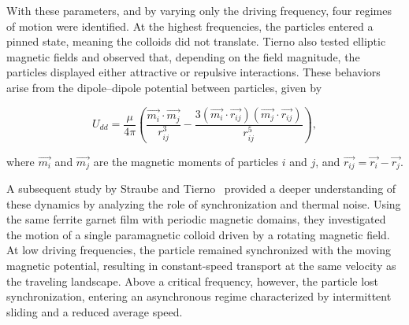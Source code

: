 With these parameters, and by varying only the driving frequency, four regimes of motion were identified. At the highest frequencies, the particles entered a pinned state, meaning the colloids did not translate. Tierno also tested elliptic magnetic fields and observed that, depending on the field magnitude, the particles displayed either attractive or repulsive interactions. These behaviors arise from the dipole–dipole potential between particles, given by

\begin{equation}
  U_{dd} = \frac{\mu}{4\pi} \left( \frac{\vec{m_i} \cdot \vec{m_j}}{r^3_{ij}} - \frac{3(\vec{m_i} \cdot \vec{r_{ij}})(\vec{m_j} \cdot \vec{r_{ij}})}{r^5_{ij}} \right),
\label{eq:dipolepairpotential}
\end{equation}

where $\vec{m_i}$ and $\vec{m_j}$ are the magnetic moments of particles $i$ and $j$, and $\vec{r_{ij}} = \vec{r_i} - \vec{r_j}$.

A subsequent study by Straube and Tierno~\cite{straube2013synchronous} provided a deeper understanding of these dynamics by analyzing the role of synchronization and thermal noise. Using the same ferrite garnet film with periodic magnetic domains, they investigated the motion of a single paramagnetic colloid driven by a rotating magnetic field. At low driving frequencies, the particle remained synchronized with the moving magnetic potential, resulting in constant-speed transport at the same velocity as the traveling landscape. Above a critical frequency, however, the particle lost synchronization, entering an asynchronous regime characterized by intermittent sliding and a reduced average speed.

